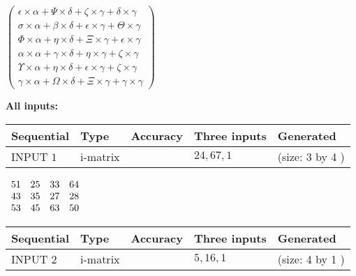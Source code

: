 \documentclass[12pt]{article}
\begin{document}
   
 $   \left( \begin{array}
 {
 c
 }
 \epsilon \times  \alpha   +  \Psi \times  \delta   +                     \zeta \times  \gamma   +  \delta \times  \gamma \\ 
 \sigma \times  \alpha   +  \beta \times  \delta   +  \epsilon \times  \gamma   +  \Theta \times  \gamma \\ 
 \Phi \times  \alpha   +  \eta \times  \delta   +                     \Xi \times  \gamma   +  \epsilon \times  \gamma \\ 
 \alpha \times  \alpha   +  \gamma \times  \delta   +  \eta \times  \gamma   +                     \zeta \times  \gamma \\ 
 \Upsilon \times  \alpha   +  \eta \times  \delta   +  \epsilon \times  \gamma   +                     \zeta \times  \gamma \\ 
 \gamma \times  \alpha   +  \Omega \times  \delta   +                     \Xi \times  \gamma   +  \gamma \times  \gamma
 \end{array} \right) $ 
   
   
\noindent\vspace{0.1in}\hspace{-0.08in} {\textbf{\Large{All inputs: }}}
   
   
  
  
\noindent\begin{tabular}{|l|l|l|l|l|}
\hline
 Sequential & Type & Accuracy & Three inputs & Generated \\ 
\hline
 
 
  INPUT $  1 $ & i-matrix &  & $
 24
 , 
 67
 , 
 1
 $ & (size:  3  by  4 )
 \\  \hline  
 \end{tabular}
   
   
 $\begin{array}{
 c
 c
 c
 c
 }
 51  & 
 25  & 
 33  & 
 64  \\ 
 43  & 
 35  & 
 27  & 
 28  \\ 
 53  & 
 45  & 
 63  & 
 50
\end{array}  $ 
  
  
\noindent\begin{tabular}{|l|l|l|l|l|}
\hline
 Sequential & Type & Accuracy & Three inputs & Generated \\ 
\hline
 
 
  INPUT $  2 $ & i-matrix &  & $
 5
 , 
 16
 , 
 1
 $ & (size:  4  by  1 )
 \\  \hline  
 \end{tabular}
   
\end{document}
